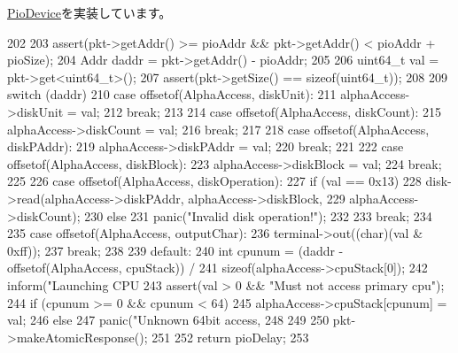 \hyperlink{classPioDevice_afe8371668d023bb2516b286e5e399b6f}{PioDevice}を実装しています。


\begin{DoxyCode}
202 {
203     assert(pkt->getAddr() >= pioAddr && pkt->getAddr() < pioAddr + pioSize);
204     Addr daddr = pkt->getAddr() - pioAddr;
205 
206     uint64_t val = pkt->get<uint64_t>();
207     assert(pkt->getSize() == sizeof(uint64_t));
208 
209     switch (daddr) {
210       case offsetof(AlphaAccess, diskUnit):
211         alphaAccess->diskUnit = val;
212         break;
213 
214       case offsetof(AlphaAccess, diskCount):
215         alphaAccess->diskCount = val;
216         break;
217 
218       case offsetof(AlphaAccess, diskPAddr):
219         alphaAccess->diskPAddr = val;
220         break;
221 
222       case offsetof(AlphaAccess, diskBlock):
223         alphaAccess->diskBlock = val;
224         break;
225 
226       case offsetof(AlphaAccess, diskOperation):
227         if (val == 0x13)
228             disk->read(alphaAccess->diskPAddr, alphaAccess->diskBlock,
229                        alphaAccess->diskCount);
230         else
231             panic("Invalid disk operation!");
232 
233         break;
234 
235       case offsetof(AlphaAccess, outputChar):
236         terminal->out((char)(val & 0xff));
237         break;
238 
239       default:
240         int cpunum = (daddr - offsetof(AlphaAccess, cpuStack)) /
241                      sizeof(alphaAccess->cpuStack[0]);
242         inform("Launching CPU %
243         assert(val > 0 && "Must not access primary cpu");
244         if (cpunum >= 0 && cpunum < 64)
245             alphaAccess->cpuStack[cpunum] = val;
246         else
247             panic("Unknown 64bit access, %
248     }
249 
250     pkt->makeAtomicResponse();
251 
252     return pioDelay;
253 }
\end{DoxyCode}


